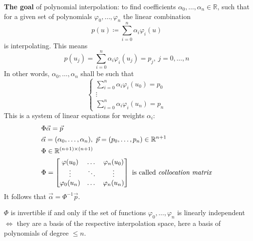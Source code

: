 \textbf{The goal} of polynomial interpolation: to find coefficients
$\alpha_0, \dots, \alpha_n \in \mathbb{R}$, such that for 
a given set of polynomials $\varphi_0, \dots, \varphi_n$
the linear combination
\[
    p(u) \coloneqq \sum_{i=0}^n \alpha_i \varphi_i(u)
\]
is interpolating. This means
\[
    p(u_j) = \sum_{i=0}^n \alpha_i \varphi_i(u_j) = p_j,\ j = 0, \dots, n
\]
In other words, $\alpha_0, \dots, \alpha_n$ shall be such that
\[
    \begin{cases}
        \sum_{i=0}^n \alpha_i \varphi_i(u_0) = p_0\\
        \vdots\\
        \sum_{i=0}^n \alpha_i \varphi_i(u_n) = p_n
    \end{cases}
\]
This is a system of linear equations for weights $\alpha_i$:
\begin{align*}
    &
    \Phi \vec{\alpha} = \vec{p}
    \\&
    \vec{\alpha} = (\alpha_0, \dots, \alpha_n),\
    \vec{p} = (p_0, \dots, p_n) \in \mathbb{R}^{n + 1}
    \\&
    \Phi \in \mathbb{R}^{(n + 1) \times (n + 1)}
    \\&
    \Phi = \begin{bmatrix}
        \varphi(u_0) & \dots & \varphi_n(u_0)\\
        \vdots & \ddots & \vdots\\
        \varphi_0(u_n) & \dots & \varphi_n(u_n)
    \end{bmatrix}
    \text{ is called \textit{collocation matrix}}
\end{align*}
It follows that $\vec{\alpha} = \Phi^{-1} \vec{p}$.

$\Phi$ is invertible if and only if the set of functions $\varphi_0, \dots, \varphi_n$
is linearly independent $\Longleftrightarrow$ they are a basis of the respective
interpolation space, here a basis of polynomials of degree $\le n$.
